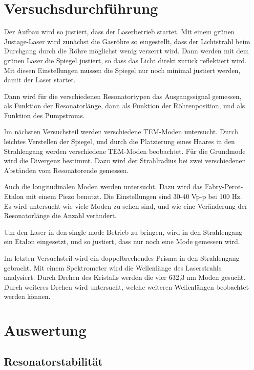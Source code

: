\documentclass[10pt,twoside]{article}
\renewcommand{\1}{^{-1}}
\renewcommand{\2}{^{-2}}
\newcommand{\3}{^{-3}}
\newcommand{\4}{^{-4}}
\newcommand{\5}{^{-5}}
\newcommand{\6}{^{-6}}
\newcommand{\7}{^{-7}}
\newcommand{\8}{^{-8}}
\newcommand{\9}{^{-9}}
\begin{document}
\section{Versuchsdurchführung}

Der Aufbau wird so justiert, dass der Laserbetrieb startet.
Mit einem grünen Justage-Laser wird zunächst die Gasröhre so eingestellt, dass der Lichtstrahl beim Durchgang durch die Röhre möglichst wenig verzerrt wird.
Dann werden mit dem grünen Laser die Spiegel justiert, so dass das Licht direkt zurück reflektiert wird.
Mit diesen Einstellungen müssen die Spiegel nur noch minimal justiert werden, damit der Laser startet.

Dann wird für die verschiedenen Resonatortypen das Ausgangssignal gemessen, als Funktion der Resonatorlänge, dann als Funktion der Röhrenposition, und als Funktion des Pumpstroms.

Im nächsten Versuchsteil werden verschiedene TEM-Moden untersucht.
Durch leichtes Verstellen der Spiegel, und durch die Platzierung eines Haares in den Strahlengang werden verschiedene TEM-Moden beobachtet.
Für die Grundmode wird die Divergenz bestimmt. Dazu wird der Strahlradius bei zwei verschiedenen Abständen vom Resonatorende gemessen.

Auch die longitudinalen Moden werden untersucht. Dazu wird das Fabry-Perot-Etalon mit einem Piezo benutzt. Die Einstellungen sind 30-40 Vp-p bei 100 Hz.
Es wird untersucht wie viele Moden zu sehen sind, und wie eine Veränderung der Resonatorlänge die Anzahl verändert.

Um den Laser in den single-mode Betrieb zu bringen, wird in den Strahlengang ein Etalon eingesetzt, und so justiert, dass nur noch eine Mode gemessen wird.

Im letzten Versuchsteil wird ein doppelbrechendes Prisma in den Strahlengang gebracht. Mit einem Spektrometer wird die Wellenlänge des Laserstrahls analysiert. Durch Drehen des Kristalls werden die vier 632,3 nm Moden gesucht. Durch weiteres Drehen wird untersucht, welche weiteren Wellenlängen beobachtet werden können.


\section{Auswertung}

\subsection{Resonatorstabilität}
\end{document}
